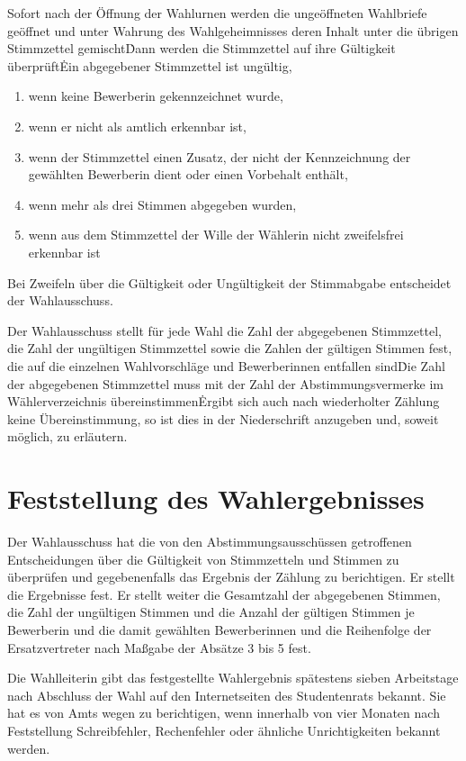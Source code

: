 \begin{multicols}{2}
\Abs \Satz Sofort nach der Öffnung der Wahlurnen werden die ungeöffneten Wahlbriefe geöffnet und unter Wahrung des Wahlgeheimnisses deren Inhalt unter die übrigen Stimmzettel gemischt\. Dann werden die Stimmzettel auf ihre Gültigkeit überprüft\. Ein abgegebener Stimmzettel ist ungültig,
\begin{enumerate}
\item wenn keine Bewerberin gekennzeichnet wurde,
\item wenn er nicht als amtlich erkennbar ist,
\item wenn der Stimmzettel einen Zusatz, der nicht der Kennzeichnung der gewählten
Bewerberin dient oder einen Vorbehalt enthält,
\item wenn mehr als drei Stimmen abgegeben wurden,
\item wenn aus dem Stimmzettel der Wille der Wählerin nicht zweifelsfrei erkennbar ist
\end {enumerate}

\Abs \Satz Bei Zweifeln über die Gültigkeit oder Ungültigkeit der Stimmabgabe entscheidet der Wahlausschuss.

\Abs \Satz Der Wahlausschuss stellt für jede Wahl die Zahl der abgegebenen Stimmzettel, die Zahl der ungültigen Stimmzettel sowie die Zahlen der gültigen Stimmen fest, die auf die einzelnen Wahlvorschläge und Bewerberinnen entfallen sind\. Die Zahl der abgegebenen Stimmzettel muss mit der Zahl der Abstimmungsvermerke im Wählerverzeichnis übereinstimmen\. Ergibt sich auch nach wiederholter Zählung keine Übereinstimmung, so ist dies in der Niederschrift anzugeben und, soweit möglich, zu erläutern.

\section {Feststellung des Wahlergebnisses}
\Abs \Satz Der Wahlausschuss hat die von den Abstimmungsausschüssen getroffenen Entscheidungen über die Gültigkeit von Stimmzetteln und Stimmen zu überprüfen und gegebenenfalls das Ergebnis der Zählung zu berichtigen. Er stellt die Ergebnisse fest. Er stellt weiter die Gesamtzahl der abgegebenen Stimmen, die Zahl der ungültigen Stimmen und die Anzahl der gültigen Stimmen je Bewerberin und die damit gewählten Bewerberinnen und die Reihenfolge der Ersatzvertreter nach Maßgabe der Absätze 3 bis 5 fest.

\Abs \Satz Die Wahlleiterin gibt das festgestellte Wahlergebnis spätestens sieben Arbeitstage nach Abschluss der Wahl auf den Internetseiten des Studentenrats bekannt. Sie hat es von Amts wegen zu berichtigen, wenn innerhalb von vier Monaten nach Feststellung Schreibfehler, Rechenfehler oder ähnliche Unrichtigkeiten bekannt werden.


\end{multicols}
